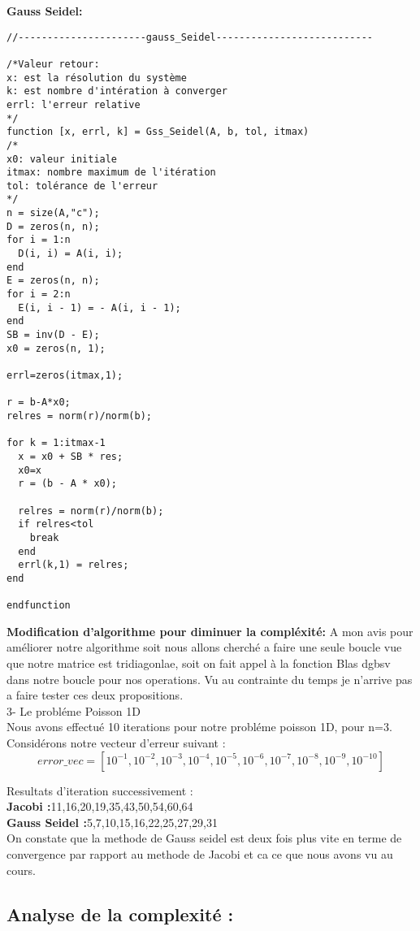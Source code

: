 \documentclass[12pt]{report}
\begin{document}
\textbf{Gauss Seidel:}
\begin{lstlisting}
//----------------------gauss_Seidel---------------------------

/*Valeur retour:
x: est la résolution du système
k: est nombre d'intération à converger
errl: l'erreur relative
*/
function [x, errl, k] = Gss_Seidel(A, b, tol, itmax)
/*
x0: valeur initiale
itmax: nombre maximum de l'itération
tol: tolérance de l'erreur
*/    
n = size(A,"c");
D = zeros(n, n);
for i = 1:n
  D(i, i) = A(i, i);
end
E = zeros(n, n);
for i = 2:n
  E(i, i - 1) = - A(i, i - 1);
end
SB = inv(D - E);
x0 = zeros(n, 1);

errl=zeros(itmax,1);

r = b-A*x0;
relres = norm(r)/norm(b);

for k = 1:itmax-1 
  x = x0 + SB * res;
  x0=x
  r = (b - A * x0);

  relres = norm(r)/norm(b);
  if relres<tol
    break
  end
  errl(k,1) = relres;
end

endfunction
\end{lstlisting}

\textbf{Modification d'algorithme pour diminuer la compléxité: }
A mon avis pour améliorer notre algorithme soit nous allons cherché a faire une seule boucle vue que notre matrice est tridiagonlae, soit on fait appel à la fonction Blas dgbsv dans notre boucle pour nos operations.
Vu au contrainte du temps je n'arrive pas a faire tester ces deux propositions.\\

3- Le probléme Poisson 1D\\

Nous avons effectué 10 iterations pour notre probléme poisson 1D, pour n=3. Considérons notre vecteur d'erreur suivant :
$$error\_vec = [10^{-1}, 10^{-2}, 10^{-3}, 10^{-4}, 10^{-5}, 10^{-6}, 10^{-7}, 10^{-8}, 10^{-9}, 10^{-10}]
$$

Resultats d'iteration successivement :\\[0.2cm]
\textbf{Jacobi :}11,16,20,19,35,43,50,54,60,64\\
\textbf{Gauss Seidel :}5,7,10,15,16,22,25,27,29,31\\

On constate que la methode de Gauss seidel est deux fois plus vite en terme de convergence par rapport au methode de Jacobi et ca ce que nous avons vu au cours.


\subsection{Analyse de la complexité :}
\end{document}
